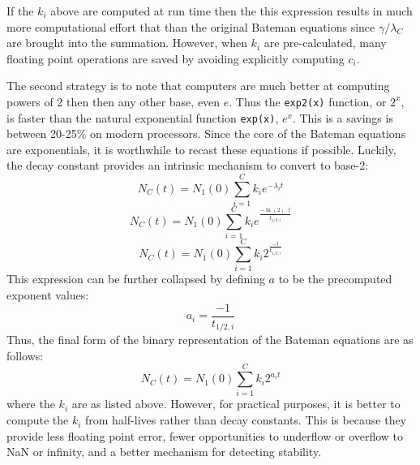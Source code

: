\documentclass[letterpaper]{physor2018}
\begin{document}
If the $k_i$ above are computed at run time then the this expression results in much more
computational effort that than the original Bateman equations since $\gamma/\lambda_C$
are brought into the summation. However, when $k_i$ are pre-calculated,
many floating point operations are saved by avoiding explicitly computing $c_i$.

The second strategy is to note that computers are much better at computing powers of
2 then then any other base, even $e$. Thus the \texttt{exp2(x)} function, or $2^x$,
is faster than the natural exponential function \texttt{exp(x)}, $e^x$.
This is a savings is between 20-25\% on modern processors.  Since the core of the Bateman equations
are exponentials, it is worthwhile to recast these equations if possible. Luckily, the decay constant
provides an intrinsic mechanism to convert to base-2:
\begin{equation}
\label{n-base-2-0}
    N_C(t) = N_1(0) \sum_{i=1}^C k_{i} e^{-\lambda_i t}
\end{equation}
\begin{equation}
\label{n-base-2-1}
    N_C(t) = N_1(0) \sum_{i=1}^C k_{i} e^{\frac{-\ln(2)\cdot t}{t_{1/2,i}}}
\end{equation}
\begin{equation}
\label{n-base-1}
    N_C(t) = N_1(0) \sum_{i=1}^C k_{i} 2^{\frac{-t}{t_{1/2,i}}}
\end{equation}
This expression can be further collapsed by defining $a$ to be the precomputed
exponent values:
\begin{equation}
\label{a-def}
    a_i = \frac{-1}{t_{1/2,i}}
\end{equation}
Thus, the final form of the binary representation of the Bateman equations are
as follows:
\begin{equation}
\label{final-form-a}
    N_C(t) = N_1(0) \sum_{i=1}^C k_{i} 2^{a_i t}
\end{equation}
where the $k_i$ are as listed above.  However, for practical purposes, it is better to
compute the $k_i$ from half-lives rather than decay constants.  This is because they
provide less floating point error, fewer opportunities to underflow or overflow to NaN or infinity,
and a better mechanism for detecting stability.
\end{document}
